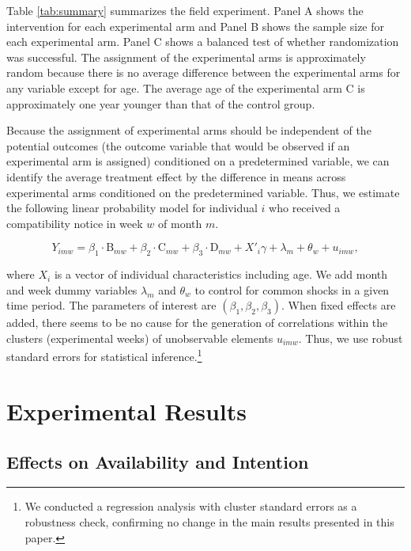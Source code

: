 \documentclass[12pt, a4paper]{article}
\begin{document}
Table \ref{tab:summary} summarizes the field experiment. Panel A shows the intervention for each experimental arm and Panel B shows the sample size for each experimental arm. Panel C shows a balanced test of whether randomization was successful. The assignment of the experimental arms is approximately random because there is no average difference between the experimental arms for any variable except for age. The average age of the experimental arm C is approximately one year younger than that of the control group.

Because the assignment of experimental arms should be independent of the potential outcomes (the outcome variable that would be observed if an experimental arm is assigned) conditioned on a predetermined variable, we can identify the average treatment effect by the difference in means across experimental arms conditioned on the predetermined variable. Thus, we estimate the following linear probability model for individual \(i\) who received a compatibility notice in week \(w\) of month \(m\).

\begin{equation}
  Y_{imw} =
  \beta_1 \cdot \text{B}_{mw} + \beta_2 \cdot \text{C}_{mw} + \beta_3 \cdot \text{D}_{mw}
  + X'_i \gamma + \lambda_m + \theta_w + u_{imw}, \label{eq:reg}
\end{equation}

\noindent
where \(X_i\) is a vector of individual characteristics including age. We add month and week dummy variables \(\lambda_m\) and \(\theta_w\) to control for common shocks in a given time period. The parameters of interest are \((\beta_1, \beta_2, \beta_3)\). When fixed effects are added, there seems to be no cause for the generation of correlations within the clusters (experimental weeks) of unobservable elements \(u_{imw}\). Thus, we use robust standard errors for statistical inference.\footnote{We conducted a regression analysis with cluster standard errors as a robustness check, confirming no change in the main results presented in this paper.}

\hypertarget{result}{%
\section{Experimental Results}\label{result}}

\hypertarget{main}{%
\subsection{Effects on Availability and Intention}\label{main}}
\end{document}
